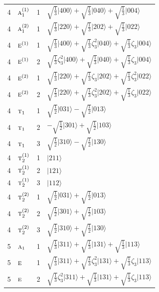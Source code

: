 \documentclass[11pt]{article}
\newcommand{\irr}[1]{\text{\normalfont\scshape #1}}
\newcommand{\rootunity}[1]{\zeta_{#1}}
\newcommand{\occ}[1]{\lvert #1\rangle}
\begin{document}
\begin{longtable}{c l c p{}}
\hline
4 & $\irr{a}_{1}^{(1)}$ & 1 & $\sqrt{\tfrac{1}{3}}\occ{400}+\sqrt{\tfrac{1}{3}}\occ{040}+\sqrt{\tfrac{1}{3}}\occ{004}$\\
4 & $\irr{a}_{1}^{(2)}$ & 1 & $\sqrt{\tfrac{1}{3}}\occ{220}+\sqrt{\tfrac{1}{3}}\occ{202}+\sqrt{\tfrac{1}{3}}\occ{022}$\\
4 & $\irr{e}^{(1)}$ & 1 & $\sqrt{\tfrac{1}{3}}\occ{400}+\sqrt{\tfrac{1}{3}}\rootunity{3}^{2}\occ{040}+\sqrt{\tfrac{1}{3}}\rootunity{3}\occ{004}$\\
4 & $\irr{e}^{(1)}$ & 2 & $\sqrt{\tfrac{1}{3}}\rootunity{3}^{2}\occ{400}+\sqrt{\tfrac{1}{3}}\occ{040}+\sqrt{\tfrac{1}{3}}\rootunity{3}\occ{004}$\\
4 & $\irr{e}^{(2)}$ & 1 & $\sqrt{\tfrac{1}{3}}\occ{220}+\sqrt{\tfrac{1}{3}}\rootunity{3}\occ{202}+\sqrt{\tfrac{1}{3}}\rootunity{3}^{2}\occ{022}$\\
4 & $\irr{e}^{(2)}$ & 2 & $\sqrt{\tfrac{1}{3}}\occ{220}+\sqrt{\tfrac{1}{3}}\rootunity{3}^{2}\occ{202}+\sqrt{\tfrac{1}{3}}\rootunity{3}\occ{022}$\\
4 & $\irr{t}_{1}$ & 1 & $\sqrt{\tfrac{1}{2}}\occ{031}-\sqrt{\tfrac{1}{2}}\occ{013}$\\
4 & $\irr{t}_{1}$ & 2 & $-\sqrt{\tfrac{1}{2}}\occ{301}+\sqrt{\tfrac{1}{2}}\occ{103}$\\
4 & $\irr{t}_{1}$ & 3 & $\sqrt{\tfrac{1}{2}}\occ{310}-\sqrt{\tfrac{1}{2}}\occ{130}$\\
4 & $\irr{t}_{2}^{(1)}$ & 1 & $\occ{211}$\\
4 & $\irr{t}_{2}^{(1)}$ & 2 & $\occ{121}$\\
4 & $\irr{t}_{2}^{(1)}$ & 3 & $\occ{112}$\\
4 & $\irr{t}_{2}^{(2)}$ & 1 & $\sqrt{\tfrac{1}{2}}\occ{031}+\sqrt{\tfrac{1}{2}}\occ{013}$\\
4 & $\irr{t}_{2}^{(2)}$ & 2 & $\sqrt{\tfrac{1}{2}}\occ{301}+\sqrt{\tfrac{1}{2}}\occ{103}$\\
4 & $\irr{t}_{2}^{(2)}$ & 3 & $\sqrt{\tfrac{1}{2}}\occ{310}+\sqrt{\tfrac{1}{2}}\occ{130}$\\
\hline
5 & $\irr{a}_{1}$ & 1 & $\sqrt{\tfrac{1}{3}}\occ{311}+\sqrt{\tfrac{1}{3}}\occ{131}+\sqrt{\tfrac{1}{3}}\occ{113}$\\
5 & $\irr{e}$ & 1 & $\sqrt{\tfrac{1}{3}}\occ{311}+\sqrt{\tfrac{1}{3}}\rootunity{3}^{2}\occ{131}+\sqrt{\tfrac{1}{3}}\rootunity{3}\occ{113}$\\
5 & $\irr{e}$ & 2 & $\sqrt{\tfrac{1}{3}}\rootunity{3}^{2}\occ{311}+\sqrt{\tfrac{1}{3}}\occ{131}+\sqrt{\tfrac{1}{3}}\rootunity{3}\occ{113}$\\

\end{longtable}
\end{document}
